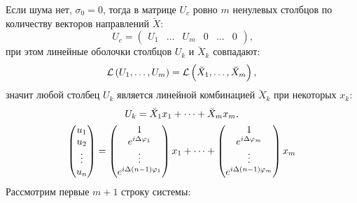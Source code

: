 Если шума нет, $\sigma_0 = 0$, тогда в матрице $U_c$ ровно $m$ ненулевых столбцов по количеству векторов направлений $\breve{X}$:
\begin{equation}~\label{direction:U_columns}
    U_c
    = \begin{pmatrix}
        U_1 & \dots & U_m & 0 & \dots & 0
    \end{pmatrix} ,
\end{equation}
при этом линейные оболочки столбцов $U_k$ и $\breve{X}_k$ совпадают:
\[
    \mathcal{L} \left ( U_1, \dots, U_m \right ) = \mathcal{L} \left ( \breve{X}_1, \dots, \breve{X}_m \right ) ,
\]
значит любой столбец $U_k$ является линейной комбинацией $\breve{X}_k$ при некоторых $x_k$:
\begin{gather*}
    U_k = \breve{X}_1 x_1 + \dots + \breve{X}_m x_m,
    \notag \\
    \begin{pmatrix}
        u_1    \\
        u_2    \\
        \vdots \\
        u_n
    \end{pmatrix}
    = \begin{pmatrix}
        1                      \\
        e^{i \Delta \varphi_1} \\
        \vdots                 \\
        e^{i \Delta (n-1) \varphi_1}
    \end{pmatrix}
    x_1
    + \dots
    + \begin{pmatrix}
        1                      \\
        e^{i \Delta \varphi_m} \\
        \vdots                 \\
        e^{i \Delta (n-1) \varphi_m}
    \end{pmatrix}
    x_m
\end{gather*}
Рассмотрим первые $m+1$ строку системы:
